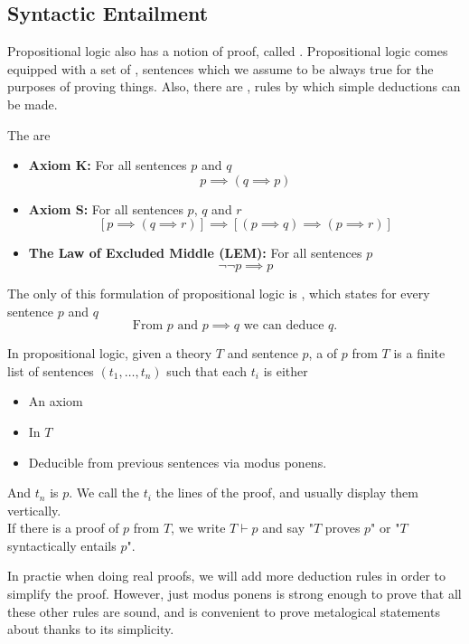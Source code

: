 \documentclass[11pt]{article}
\begin{document}
\subsection{Syntactic Entailment}
Propositional logic also has a notion of proof, called . Propositional logic comes equipped with a set of , sentences which we assume to be always true for the purposes of proving things. Also, there are , rules by which simple deductions can be made.
\begin{defi}
    The  are
    \begin{itemize}
        \item \textbf{Axiom K:} For all sentences $p$ and $q$ \[p \implies (q \implies p)\]
        \item \textbf{Axiom S:} For all sentences $p$, $q$ and $r$ \[[p \implies (q \implies r)] \implies [(p \implies q) \implies (p \implies r)]\]
        \item \textbf{The Law of Excluded Middle (LEM):} For all sentences $p$ \[\neg\neg p \implies p\]
    \end{itemize}
\end{defi}
\begin{defi}
    The only  of this formulation of propositional logic is , which states for every sentence $p$ and $q$
    \[\text{From } p \text{ and } p \implies q \text{ we can deduce } q. \]
\end{defi}
\begin{defi}[Proof]
    In propositional logic, given a theory $T$ and sentence $p$, a  of $p$ from $T$ is a finite  list of sentences $(t_1, \dots, t_n)$ such that each $t_i$ is either
    \begin{itemize}
        \item An axiom
        \item In $T$
        \item Deducible from previous sentences via modus ponens.
    \end{itemize}
    And $t_n$ is $p$. We call the $t_i$ the lines of the proof, and usually display them vertically.
    \\If there is a proof of $p$ from $T$, we write $T \vdash p$ and say "$T$ proves $p$" or "$T$ syntactically entails $p$".
\end{defi}
\begin{sidenote}
    In practie when doing real proofs, we will add more deduction rules in order to simplify the proof. However, just modus ponens is strong enough to prove that all these other rules are sound, and is convenient to prove metalogical statements about thanks to its simplicity.
\end{sidenote}
\pagebreak
\end{document}
